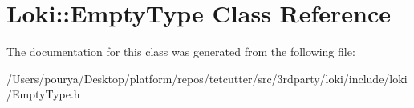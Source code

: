 \hypertarget{classLoki_1_1EmptyType}{}\section{Loki\+:\+:Empty\+Type Class Reference}
\label{classLoki_1_1EmptyType}


The documentation for this class was generated from the following file\+:\begin{DoxyCompactItemize}
\item 
/\+Users/pourya/\+Desktop/platform/repos/tetcutter/src/3rdparty/loki/include/loki/Empty\+Type.\+h\end{DoxyCompactItemize}
